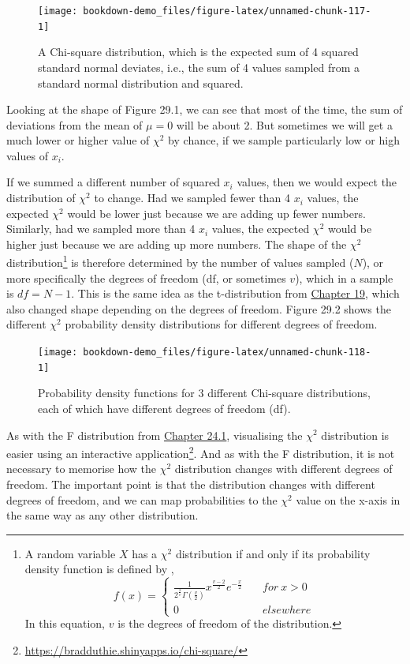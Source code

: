 \documentclass[
  openany]{scrbook}
\begin{document}
\begin{figure}
\texttt{[image: bookdown-demo\_files/figure-latex/unnamed-chunk-117-1]} \caption{A Chi-square distribution, which is the expected sum of 4 squared standard normal deviates, i.e., the sum of 4 values sampled from a standard normal distribution and squared.}\label{fig:unnamed-chunk-117}
\end{figure}

Looking at the shape of Figure 29.1, we can see that most of the time, the sum of deviations from the mean of \(\mu = 0\) will be about 2.
But sometimes we will get a much lower or higher value of \(\chi^{2}\) by chance, if we sample particularly low or high values of \(x_{i}\).

If we summed a different number of squared \(x_{i}\) values, then we would expect the distribution of \(\chi^{2}\) to change.
Had we sampled fewer than 4 \(x_{i}\) values, the expected \(\chi^{2}\) would be lower just because we are adding up fewer numbers.
Similarly, had we sampled more than 4 \(x_{i}\) values, the expected \(\chi^{2}\) would be higher just because we are adding up more numbers.
The shape of the \(\chi^{2}\) distribution\footnote{A random variable \(X\) has a \(\chi^{2}\) distribution if and only if its probability density function is defined by \citep{Miller2004}, \[f(x) = \left\{\begin{array}{ll}\frac{1}{2^{\frac{2}{v}}\Gamma\left(\frac{v}{2}\right)}x^{\frac{v-2}{2}}e^{-\frac{x}{2}} & \quad for\:x > 0 \\ 0 & \quad elsewhere \end{array}\right.\] In this equation, \(v\) is the degrees of freedom of the distribution.} is therefore determined by the number of values sampled (\(N\)), or more specifically the degrees of freedom (df, or sometimes \(v\)), which in a sample is \(df = N - 1\).
This is the same idea as the t-distribution from \protect\hyperlink{Chapter_19}{Chapter 19}, which also changed shape depending on the degrees of freedom.
Figure 29.2 shows the different \(\chi^{2}\) probability density distributions for different degrees of freedom.

\begin{figure}
\texttt{[image: bookdown-demo\_files/figure-latex/unnamed-chunk-118-1]} \caption{Probability density functions for 3 different Chi-square distributions, each of which have different degrees of freedom (df).}\label{fig:unnamed-chunk-118}
\end{figure}

As with the F distribution from \protect\hyperlink{the-f-distribution}{Chapter 24.1}, visualising the \(\chi^{2}\) distribution is easier using an interactive application\footnote{\url{https://bradduthie.shinyapps.io/chi-square/}}.
And as with the F distribution, it is not necessary to memorise how the \(\chi^{2}\) distribution changes with different degrees of freedom.
The important point is that the distribution changes with different degrees of freedom, and we can map probabilities to the \(\chi^{2}\) value on the x-axis in the same way as any other distribution.
\end{document}

